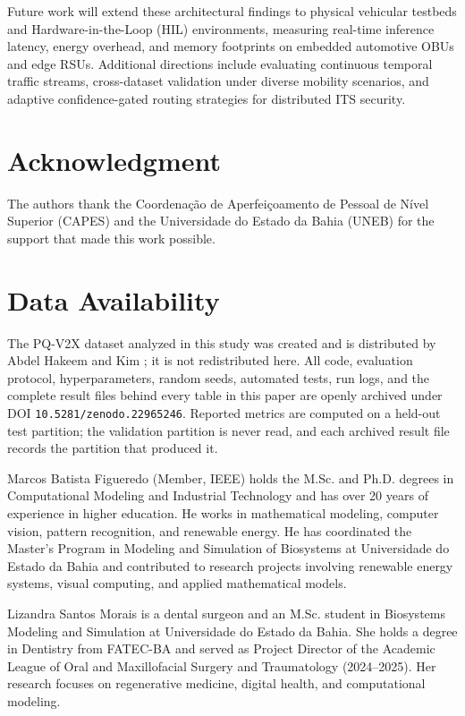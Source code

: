 \documentclass{IEEEoj}
\begin{document}
Future work will extend these architectural findings to physical vehicular testbeds and Hardware-in-the-Loop (HIL) environments, measuring real-time inference latency, energy overhead, and memory footprints on embedded automotive OBUs and edge RSUs. Additional directions include evaluating continuous temporal traffic streams, cross-dataset validation under diverse mobility scenarios, and adaptive confidence-gated routing strategies for distributed ITS security.

\section*{Acknowledgment}

The authors thank the Coordena\c{c}\~{a}o de Aperfei\c{c}oamento de Pessoal
de N\'{i}vel Superior (CAPES) and the Universidade do Estado da Bahia (UNEB)
for the support that made this work possible.

\section*{Data Availability}

The PQ-V2X dataset analyzed in this study was created and is distributed by
Abdel Hakeem and Kim \cite{105018710169}; it is not redistributed here. All
code, evaluation protocol, hyperparameters, random seeds, automated tests, run
logs, and the complete result files behind every table in this paper are
openly archived under DOI \texttt{10.5281/zenodo.22965246}. Reported metrics are
computed on a held-out test partition; the validation partition is never read,
and each archived result file records the partition that produced it.





\begin{IEEEbiographynophoto}{Marcos Batista Figueredo}
(Member, IEEE) holds the M.Sc. and Ph.D. degrees in Computational Modeling and Industrial
Technology and has over 20 years of experience in higher education. He works
in mathematical modeling, computer vision, pattern recognition, and renewable
energy. He has coordinated the Master's Program in Modeling and Simulation of
Biosystems at Universidade do Estado da Bahia and contributed to research
projects involving renewable energy systems, visual computing, and applied
mathematical models.
\end{IEEEbiographynophoto}

\begin{IEEEbiographynophoto}{Lizandra Santos Morais}
is a dental surgeon and an M.Sc. student in Biosystems Modeling and Simulation at Universidade do Estado da Bahia. She holds a degree in Dentistry from FATEC-BA and served as Project Director of the Academic League of Oral and Maxillofacial Surgery and Traumatology (2024--2025). Her research focuses on regenerative medicine, digital health, and computational modeling.
\end{IEEEbiographynophoto}
\end{document}

